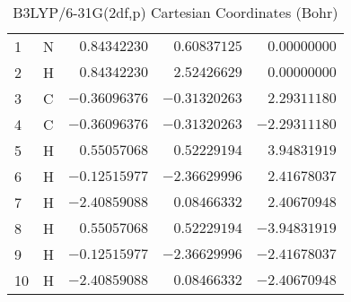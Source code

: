 \documentclass[10pt,oneside]{article}
\begin{document}
\begin{table}[h]
\centering
\caption{B3LYP/6-31G(2df,p) Cartesian Coordinates (Bohr)}
\begin{tabular}{llrrr}
\toprule
1  & N  & $ 0.84342230$ & $ 0.60837125$ & $ 0.00000000$ \\
2  & H  & $ 0.84342230$ & $ 2.52426629$ & $ 0.00000000$ \\
3  & C  & $-0.36096376$ & $-0.31320263$ & $ 2.29311180$ \\
4  & C  & $-0.36096376$ & $-0.31320263$ & $-2.29311180$ \\
5  & H  & $ 0.55057068$ & $ 0.52229194$ & $ 3.94831919$ \\
6  & H  & $-0.12515977$ & $-2.36629996$ & $ 2.41678037$ \\
7  & H  & $-2.40859088$ & $ 0.08466332$ & $ 2.40670948$ \\
8  & H  & $ 0.55057068$ & $ 0.52229194$ & $-3.94831919$ \\
9  & H  & $-0.12515977$ & $-2.36629996$ & $-2.41678037$ \\
10 & H  & $-2.40859088$ & $ 0.08466332$ & $-2.40670948$ \\
\bottomrule
\end{tabular}
\end{table}
\end{document}
